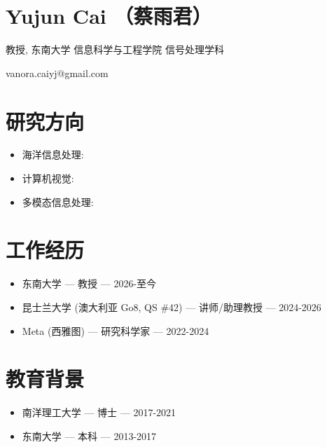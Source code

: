 \section*{Yujun Cai （蔡雨君）}
教授, 东南大学 信息科学与工程学院 信号处理学科

vanora.caiyj@gmail.com

\section*{研究方向}
\begin{itemize}
\item 海洋信息处理: 
\item 计算机视觉: 
\item 多模态信息处理: 
\end{itemize}
\section*{工作经历}
\begin{itemize}
\item 东南大学 — 教授 — 2026-至今
\item 昆士兰大学 (澳大利亚 Go8, QS \#42) — 讲师/助理教授 — 2024-2026
\item Meta (西雅图) — 研究科学家 — 2022-2024
\end{itemize}
\section*{教育背景}
\begin{itemize}
\item 南洋理工大学 — 博士 — 2017-2021
\item 东南大学 — 本科 — 2013-2017
\end{itemize}
